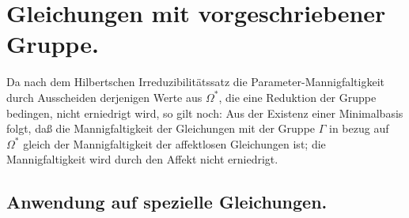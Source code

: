 \documentclass[12pt,a4paper]{article}
\begin{document}
\renewenvironment{noetherpaper}[4]{\newpage\section*{#1}\addcontentsline{toc}{section}{#1}\par\smallskip}{\par\medskip}



\section*{Gleichungen mit vorgeschriebener Gruppe.}

Da nach dem Hilbertschen Irreduzibilit\"atssatz die Parameter-Mannigfaltigkeit durch Ausscheiden derjenigen Werte aus $\Omega^{*}$, die eine Reduktion der Gruppe bedingen, nicht erniedrigt wird, so gilt noch: Aus der Existenz einer Minimalbasis folgt, da\ss{} die Mannigfaltigkeit der Gleichungen mit der Gruppe $\Gamma$ in bezug auf $\Omega^{*}$ gleich der Mannigfaltigkeit der affektlosen Gleichungen ist; die Mannigfaltigkeit wird durch den Affekt nicht erniedrigt.

\subsection*{Anwendung auf spezielle Gleichungen.}
\end{document}
